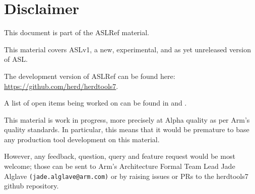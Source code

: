\chapter{Disclaimer}

This document is part of the ASLRef material.

This material covers ASLv1, a new, experimental, and as yet unreleased version of ASL.

The development version of ASLRef can be found here: \\
\url{https://github.com/herd/herdtools7}.

A list of open items being worked on can be found in 
and .

This material is work in progress, more precisely at Alpha quality as
per Arm’s quality standards. In particular, this means that it would be
premature to base any production tool development on this material.

However, any feedback, question, query and feature request would be most
welcome; those can be sent to Arm’s Architecture Formal Team Lead Jade Alglave
\texttt{(jade.alglave@arm.com)} or by raising issues or PRs to the herdtools7
github repository.
